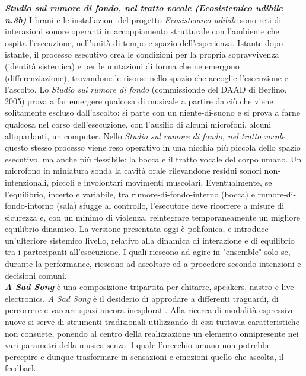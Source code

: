 \documentclass[8pt, twoside, a5paper]{extreport}
\newcommand{\descrizione}[2]{%
\noindent \textbf{\textit{#1}} %
#2 %
\\
}%
\begin{document}
\begin{multicols}{2}
\descrizione{Studio sul rumore di fondo, nel tratto vocale (Ecosistemico udibile n.3b)}{I brani e le installazioni del progetto \textit{Ecosistemico udibile} sono reti di interazioni sonore operanti in accoppiamento strutturale con l'ambiente che ospita l’esecuzione, nell’unità di tempo e spazio dell’esperienza. Istante dopo istante, il processo esecutivo crea le condizioni per la propria sopravvivenza (identità sistemica) e per le mutazioni di forma che ne emergono (differenziazione), trovandone le risorse nello spazio che accoglie l'esecuzione e l'ascolto. Lo \textit{Studio sul rumore di fondo} (commissionde del DAAD di Berlino, 2005) prova a far emergere qualcosa di musicale a partire da ciò che viene solitamente escluso dall'ascolto: si parte con un niente-di-suono e si prova a farne qualcosa nel corso dell’esecuzione, con l’ausilio di alcuni microfoni, alcuni altoparlanti, un computer. Nello \textit{Studio sul rumore di fondo, nel tratto vocale} questo stesso processo viene reso operativo in una nicchia più piccola dello spazio esecutivo, ma anche più flessibile: la bocca e il tratto vocale del corpo umano. Un microfono in miniatura sonda la cavità orale rilevandone residui sonori non-intenzionali, piccoli e involontari movimenti muscolari. Eventualmente, se l’equilibrio, incerto e variabile, tra rumore-di-fondo-interno (bocca) e rumore-di-fondo-intorno (sala) sfugge al controllo, l'esecutore deve ricorrere a misure di sicurezza e, con un minimo di violenza, reintegrare temporaneamente un migliore equilibrio dinamico. La versione presentata oggi è polifonica, e introduce un’ulteriore sistemico livello, relativo alla dinamica di interazione e di equilibrio tra i partecipanti all’esecuzione. I quali riescono ad agire in "ensemble" solo se, durante la performance, riescono ad ascoltare ed a procedere secondo intenzioni e decisioni comuni. }


\descrizione{A Sad Song}{è una composizione tripartita per chitarre, speakers, nastro e live electronics.
\textit{A Sad Song} è il desiderio di approdare a differenti traguardi, di percorrere e varcare spazi ancora inesplorati. Alla ricerca di modalità espressive nuove si serve di strumenti tradizionali utilizzando di essi tuttavia caratteristiche non consuete, ponendo al centro della realizzazione un elemento onnipresente nei vari parametri della musica senza il quale l'orecchio umano non potrebbe percepire e dunque trasformare in sensazioni e emozioni quello che ascolta, il feedback.}



\end{multicols}
\end{document}
